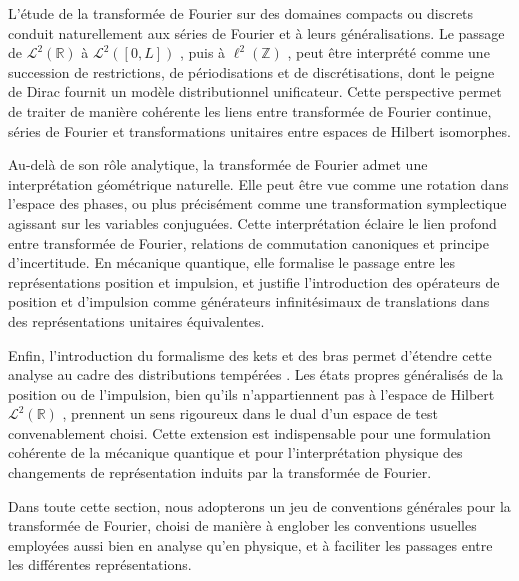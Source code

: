 \smallskip

L’étude de la transformée de Fourier sur des domaines compacts ou discrets conduit naturellement aux séries de Fourier et à leurs généralisations. Le passage de  $\mathcal{L}^2(\mathbb{R})$ à  $\mathcal{L}^2([0,L])$ , puis à  $\ell^2(\mathbb{Z})$ , peut être interprété comme une succession de restrictions, de périodisations et de discrétisations, dont le peigne de Dirac fournit un modèle distributionnel unificateur. Cette perspective permet de traiter de manière cohérente les liens entre transformée de Fourier continue, séries de Fourier et transformations unitaires entre espaces de Hilbert isomorphes.

\smallskip

Au-delà de son rôle analytique, la transformée de Fourier admet une interprétation géométrique naturelle. Elle peut être vue comme une rotation dans l’espace des phases, ou plus précisément comme une transformation symplectique agissant sur les variables conjuguées. Cette interprétation éclaire le lien profond entre transformée de Fourier, relations de commutation canoniques et principe d’incertitude. En mécanique quantique, elle formalise le passage entre les représentations position et impulsion, et justifie l’introduction des opérateurs de position et d’impulsion comme générateurs infinitésimaux de translations dans des représentations unitaires équivalentes.

\smallskip

Enfin, l’introduction du formalisme des kets et des bras permet d’étendre cette analyse au cadre des distributions tempérées \cite{AppelMathPhysiciens, leborgne2024distributions}. Les états propres généralisés de la position ou de l’impulsion, bien qu’ils n’appartiennent pas à l’espace de Hilbert  $\mathcal{L}^2(\mathbb{R})$ , prennent un sens rigoureux dans le dual d’un espace de test convenablement choisi. Cette extension est indispensable pour une formulation cohérente de la mécanique quantique et pour l’interprétation physique des changements de représentation induits par la transformée de Fourier.

\smallskip

Dans toute cette section, nous adopterons un jeu de conventions générales pour la transformée de Fourier, choisi de manière à englober les conventions usuelles employées aussi bien en analyse qu’en physique, et à faciliter les passages entre les différentes représentations.%

